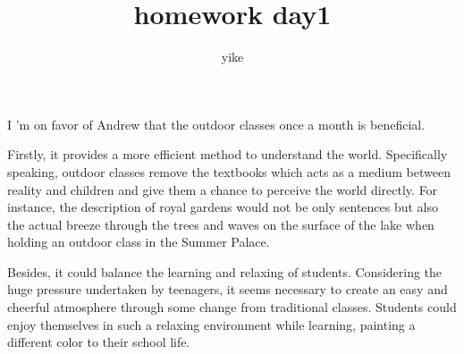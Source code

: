 \documentclass[a4paper, 10pt]{article}
\begin{document}
\title{{ \textbf {homework day1}}}
  \author{yike}
  \date{}
  
  \maketitle

I 'm on favor of Andrew that the outdoor classes once a month is beneficial. 

Firstly, it provides a more efficient method to understand the world. Specifically speaking, outdoor classes remove the textbooks which acts as a medium between reality and children and give them a chance to perceive the world directly. For instance, the description of royal gardens would not be only sentences but also the actual breeze through the trees and waves on the surface of the lake when holding an outdoor class in the Summer Palace.   

Besides, it could balance the learning and relaxing of students. Considering the huge pressure undertaken by teenagers, it seems necessary to create an easy and cheerful atmosphere through some change from traditional classes. Students could enjoy themselves in such a relaxing environment while learning, painting a different color to their school life.
\end{document}
